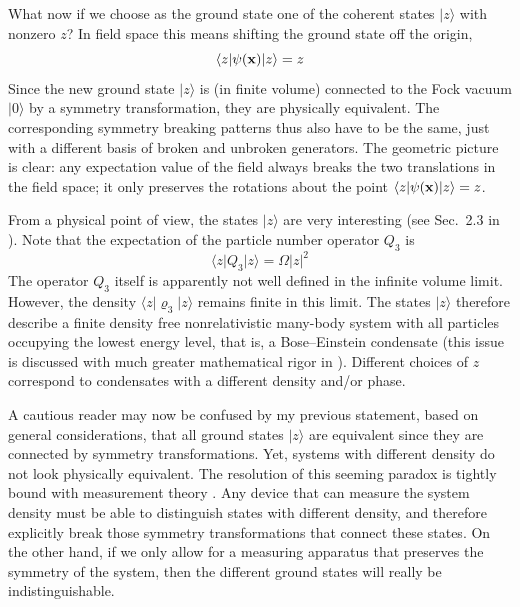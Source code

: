 \documentclass[final,3p,times,12pt,a4paper,sort&compress]{elsarticle}
\newcommand\vek[1]{{\boldsymbol{\bf #1}}}   %
\newcommand\bra[1]{\langle#1\vert}          %
\newcommand\ket[1]{\vert#1\rangle}          %
\newcommand\vr{\varrho}
\newcommand\abs[1]{\left|#1\right|}         %
\begin{document}
What now if we choose as the ground state one of the coherent states $\ket z$
with nonzero $z$? In field space this means shifting the ground state off the
origin,
\begin{equation}
\bra z\psi(\vek x)\ket z=z
\end{equation}
Since the new ground state $\ket z$ is (in finite volume) connected to the Fock
vacuum $\ket0$ by a symmetry transformation, they are physically equivalent.
The corresponding symmetry breaking patterns thus also have to be the same,
just with a different basis of broken and unbroken generators. The geometric
picture is clear: any expectation value of the field always breaks the two
translations in the field space; it only preserves the rotations about the
point $\bra z\psi(\vek x)\ket z=z$.

From a physical point of view, the states $\ket z$ are very interesting
(see Sec.~2.3 in \cite{Miransky:1993mi}). Note that the expectation of the
particle number operator $Q_3$ is
\begin{equation}
\bra zQ_3\ket z=\Omega\abs z^2
\label{NRQ}
\end{equation}
The operator $Q_3$ itself is apparently not well defined in the infinite volume
limit. However, the density $\bra z\vr_3\ket z$ remains finite in this limit.
The states $\ket z$ therefore describe a finite density free nonrelativistic
many-body system with all particles occupying the lowest energy level, that is,
a Bose--Einstein condensate (this issue is discussed with much greater
mathematical rigor in \cite{Araki:1963aw}). Different choices of $z$ correspond
to condensates with a different density and/or phase.

A cautious reader may now be confused by my previous statement, based on
general considerations, that all ground states $\ket z$ are equivalent since
they are connected by symmetry transformations. Yet, systems with different
density do not look physically equivalent. The resolution of this seeming
paradox is tightly bound with measurement theory \cite{Guralnik:1968gu}. Any
device that can measure the system density must be able to distinguish states
with different density, and therefore explicitly break those symmetry
transformations that connect these states. On the other hand, if we only allow
for a measuring apparatus that preserves the symmetry of the system, then the
different ground states will really be indistinguishable.
\end{document}
